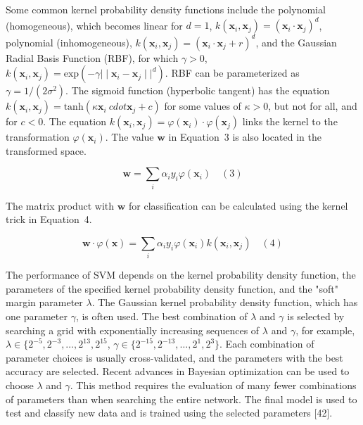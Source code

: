 \documentclass[preprint,12pt]{elsarticle}
\begin{document}
Some common kernel probability density functions include the polynomial (homogeneous), which becomes linear for $d=1$, $k(\mathbf{x}_{i}, \mathbf{x}_{j}) = {(\mathbf{x}_{i} \cdot \mathbf{x}_{j})}^{d}$, polynomial (inhomogeneous), $k(\mathbf{x}_{i}, \mathbf{x}_{j}) = {(\mathbf{x}_{i} \cdot \mathbf{x}_{j} + r)}^{d}$, and the Gaussian Radial Basis Function (RBF), for which $\gamma > 0$, $k(\mathbf{x}_{i}, \mathbf{x}_{j}) = \mathrm{exp}(- \gamma{\mid \mid \mathbf{x}_{i} - \mathbf{x}_{j} \mid \mid}^{d})$. RBF can be parameterized as $\gamma = 1 / (2{\sigma}^{2})$. The sigmoid function (hyperbolic tangent) has the equation $k(\mathbf{x}_{i}, \mathbf{x}_{j}) = \mathrm{tanh}(\kappa \mathbf{x}_{i} \ cdot \mathbf{x}_{j} + c)$ for some values of $\kappa > 0$, but not for all, and for $c < 0$. The equation $k(\mathbf{x}_{i}, \mathbf{x}_{j}) = \varphi(\mathbf{x}_{i}) \cdot \varphi(\mathbf{x}_{j})$ links the kernel to the transformation $\varphi(\mathbf{x}_{i})$. The value $\mathbf{w}$ in Equation~3 is also located in the transformed space.

\begin{equation}
	\mathbf{w} = \sum_{i} \alpha_{i}y_{i}\varphi(\mathbf{x}_{i} )
	\quad\left(3\right)
\end{equation}

The matrix product with $\mathbf{w}$ for classification can be calculated using the kernel trick in Equation~4.

\begin{equation}
	\mathbf{w} \cdot \varphi(\mathbf{x}) = \sum_{i} \alpha_{i}y_{i}\varphi (\mathbf{x}_{i}) k(\mathbf{x}_{i}, \mathbf{x}_{j})
	\quad\left(4\right)
\end{equation}

The performance of SVM depends on the kernel probability density function, the parameters of the specified kernel probability density function, and the "soft" margin parameter $\lambda$. The Gaussian kernel probability density function, which has one parameter $\gamma$, is often used. The best combination of $\lambda$ and $\gamma$ is selected by searching a grid with exponentially increasing sequences of $\lambda$ and $\gamma$, for example, $\lambda \in \{2^{-5},2^{-3},\dots,2^{13},2^{15}$, $\gamma \in \{2^{-15},2^{-13},\dots,2^{1}, 2^{3}\}$. Each combination of parameter choices is usually cross-validated, and the parameters with the best accuracy are selected. Recent advances in Bayesian optimization can be used to choose $\lambda$ and $\gamma$. This method requires the evaluation of many fewer combinations of parameters than when searching the entire network. The final model is used to test and classify new data and is trained using the selected parameters [42].
\end{document}
